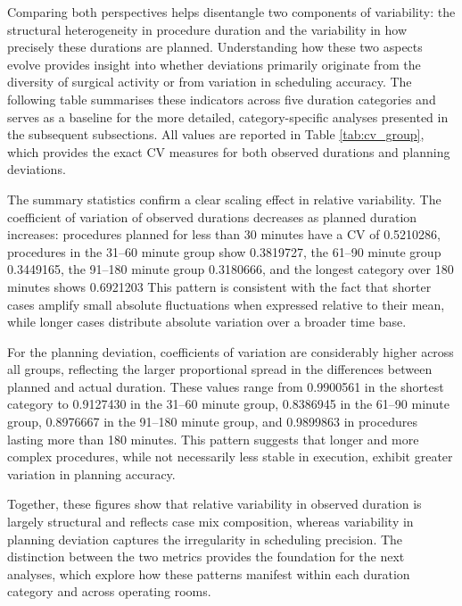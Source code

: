\documentclass[
]{article}
\begin{document}
Comparing both perspectives helps disentangle two components of
variability: the structural heterogeneity in procedure duration and the
variability in how precisely these durations are planned. Understanding
how these two aspects evolve provides insight into whether deviations
primarily originate from the diversity of surgical activity or from
variation in scheduling accuracy. The following table summarises these
indicators across five duration categories and serves as a baseline for
the more detailed, category-specific analyses presented in the
subsequent subsections. All values are reported in Table
\ref{tab:cv_group}, which provides the exact CV measures for both
observed durations and planning deviations.

The summary statistics confirm a clear scaling effect in relative
variability. The coefficient of variation of observed durations
decreases as planned duration increases: procedures planned for less
than 30 minutes have a CV of 0.5210286, procedures in the 31--60 minute
group show 0.3819727, the 61--90 minute group 0.3449165, the 91--180
minute group 0.3180666, and the longest category over 180 minutes shows
0.6921203 This pattern is consistent with the fact that shorter cases
amplify small absolute fluctuations when expressed relative to their
mean, while longer cases distribute absolute variation over a broader
time base.

For the planning deviation, coefficients of variation are considerably
higher across all groups, reflecting the larger proportional spread in
the differences between planned and actual duration. These values range
from 0.9900561 in the shortest category to 0.9127430 in the 31--60
minute group, 0.8386945 in the 61--90 minute group, 0.8976667 in the
91--180 minute group, and 0.9899863 in procedures lasting more than 180
minutes. This pattern suggests that longer and more complex procedures,
while not necessarily less stable in execution, exhibit greater
variation in planning accuracy.

Together, these figures show that relative variability in observed
duration is largely structural and reflects case mix composition,
whereas variability in planning deviation captures the irregularity in
scheduling precision. The distinction between the two metrics provides
the foundation for the next analyses, which explore how these patterns
manifest within each duration category and across operating rooms.
\end{document}
